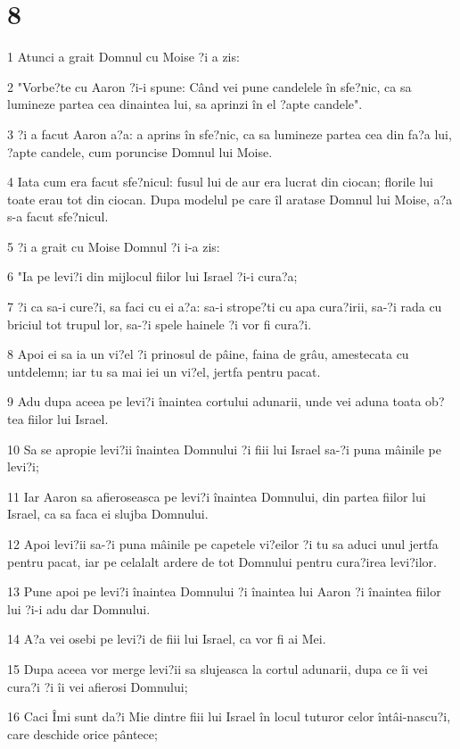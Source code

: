 \chapter{8}

\par 1 Atunci a grait Domnul cu Moise ?i a zis:
\par 2 "Vorbe?te cu Aaron ?i-i spune: Când vei pune candelele în sfe?nic, ca sa lumineze partea cea dinaintea lui, sa aprinzi în el ?apte candele".
\par 3 ?i a facut Aaron a?a: a aprins în sfe?nic, ca sa lumineze partea cea din fa?a lui, ?apte candele, cum poruncise Domnul lui Moise.
\par 4 Iata cum era facut sfe?nicul: fusul lui de aur era lucrat din ciocan; florile lui toate erau tot din ciocan. Dupa modelul pe care îl aratase Domnul lui Moise, a?a s-a facut sfe?nicul.
\par 5 ?i a grait cu Moise Domnul ?i i-a zis:
\par 6 "Ia pe levi?i din mijlocul fiilor lui Israel ?i-i cura?a;
\par 7 ?i ca sa-i cure?i, sa faci cu ei a?a: sa-i strope?ti cu apa cura?irii, sa-?i rada cu briciul tot trupul lor, sa-?i spele hainele ?i vor fi cura?i.
\par 8 Apoi ei sa ia un vi?el ?i prinosul de pâine, faina de grâu, amestecata cu untdelemn; iar tu sa mai iei un vi?el, jertfa pentru pacat.
\par 9 Adu dupa aceea pe levi?i înaintea cortului adunarii, unde vei aduna toata ob?tea fiilor lui Israel.
\par 10 Sa se apropie levi?ii înaintea Domnului ?i fiii lui Israel sa-?i puna mâinile pe levi?i;
\par 11 Iar Aaron sa afieroseasca pe levi?i înaintea Domnului, din partea fiilor lui Israel, ca sa faca ei slujba Domnului.
\par 12 Apoi levi?ii sa-?i puna mâinile pe capetele vi?eilor ?i tu sa aduci unul jertfa pentru pacat, iar pe celalalt ardere de tot Domnului pentru cura?irea levi?ilor.
\par 13 Pune apoi pe levi?i înaintea Domnului ?i înaintea lui Aaron ?i înaintea fiilor lui ?i-i adu dar Domnului.
\par 14 A?a vei osebi pe levi?i de fiii lui Israel, ca vor fi ai Mei.
\par 15 Dupa aceea vor merge levi?ii sa slujeasca la cortul adunarii, dupa ce îi vei cura?i ?i îi vei afierosi Domnului;
\par 16 Caci Îmi sunt da?i Mie dintre fiii lui Israel în locul tuturor celor întâi-nascu?i, care deschide orice pântece;
